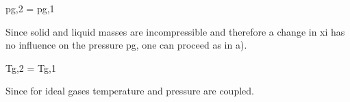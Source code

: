 pg,2 = pg,1

Since solid and liquid masses are incompressible and therefore a change in xi has no influence on the pressure pg, one can proceed as in a).

Tg,2 = Tg,1

Since for ideal gases temperature and pressure are coupled.